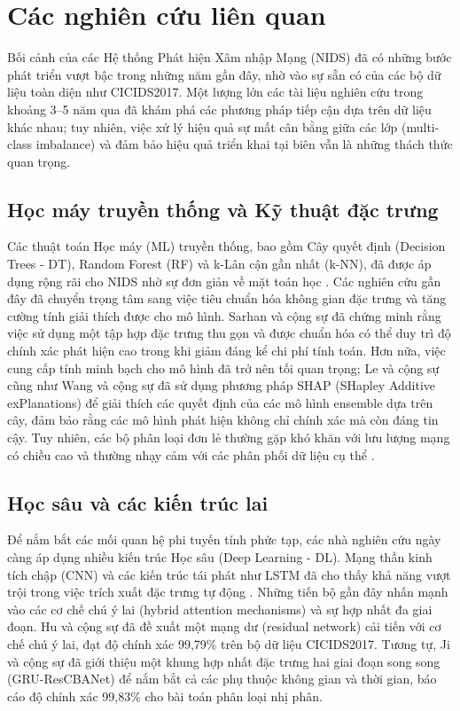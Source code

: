 \section{Các nghiên cứu liên quan}
Bối cảnh của các Hệ thống Phát hiện Xâm nhập Mạng (NIDS) đã có những bước phát triển vượt bậc trong những năm gần đây, nhờ vào sự sẵn có của các bộ dữ liệu toàn diện như CICIDS2017. Một lượng lớn các tài liệu nghiên cứu trong khoảng 3--5 năm qua đã khám phá các phương pháp tiếp cận dựa trên dữ liệu khác nhau; tuy nhiên, việc xử lý hiệu quả sự mất cân bằng giữa các lớp (multi-class imbalance) và đảm bảo hiệu quả triển khai tại biên vẫn là những thách thức quan trọng.

\subsection{Học máy truyền thống và Kỹ thuật đặc trưng}
Các thuật toán Học máy (ML) truyền thống, bao gồm Cây quyết định (Decision Trees - DT), Random Forest (RF) và k-Lân cận gần nhất (k-NN), đã được áp dụng rộng rãi cho NIDS nhờ sự đơn giản về mặt toán học \cite{breiman2001random, sharafaldin2018toward}. Các nghiên cứu gần đây đã chuyển trọng tâm sang việc tiêu chuẩn hóa không gian đặc trưng và tăng cường tính giải thích được cho mô hình. Sarhan và cộng sự \cite{sarhan2022towards} đã chứng minh rằng việc sử dụng một tập hợp đặc trưng thu gọn và được chuẩn hóa có thể duy trì độ chính xác phát hiện cao trong khi giảm đáng kể chi phí tính toán. Hơn nữa, việc cung cấp tính minh bạch cho mô hình đã trở nên tối quan trọng; Le và cộng sự \cite{le2022classification} cũng như Wang và cộng sự \cite{wang2022interpretable} đã sử dụng phương pháp SHAP (SHapley Additive exPlanations) để giải thích các quyết định của các mô hình ensemble dựa trên cây, đảm bảo rằng các mô hình phát hiện không chỉ chính xác mà còn đáng tin cậy. Tuy nhiên, các bộ phân loại đơn lẻ thường gặp khó khăn với lưu lượng mạng có chiều cao và thường nhạy cảm với các phân phối dữ liệu cụ thể \cite{gharaee2022deep}.

\subsection{Học sâu và các kiến trúc lai}
Để nắm bắt các mối quan hệ phi tuyến tính phức tạp, các nhà nghiên cứu ngày càng áp dụng nhiều kiến trúc Học sâu (Deep Learning - DL). Mạng thần kinh tích chập (CNN) và các kiến trúc tái phát như LSTM đã cho thấy khả năng vượt trội trong việc trích xuất đặc trưng tự động \cite{zhou2021deep}. Những tiến bộ gần đây nhấn mạnh vào các cơ chế chú ý lai (hybrid attention mechanisms) và sự hợp nhất đa giai đoạn. Hu và cộng sự \cite{hu2024improved} đã đề xuất một mạng dư (residual network) cải tiến với cơ chế chú ý lai, đạt độ chính xác 99,79\% trên bộ dữ liệu CICIDS2017. Tương tự, Ji và cộng sự \cite{ji2025hybrid} đã giới thiệu một khung hợp nhất đặc trưng hai giai đoạn song song (GRU-ResCBANet) để nắm bắt cả các phụ thuộc không gian và thời gian, báo cáo độ chính xác 99,83\% cho bài toán phân loại nhị phân. 

